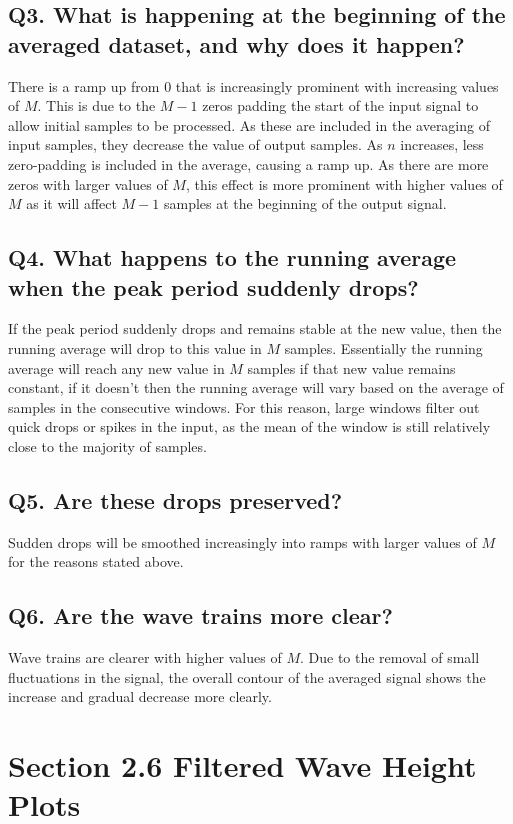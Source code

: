 \documentclass[titlepage]{scrartcl}
\begin{document}
    \subsection*{Q3. What is happening at the beginning of the averaged dataset, and why does it happen?}
    There is a ramp up from 0 that is increasingly prominent with increasing
    values of $M$. This is due to the $M-1$ zeros padding the start of the
    input signal to allow initial samples to be processed. As these are
    included in the averaging of input samples, they decrease the value of
    output samples. As $n$ increases, less zero-padding is included in the
    average, causing a ramp up. As there are more zeros with larger values of
    $M$, this effect is more prominent with higher values of $M$ as it will
    affect $M-1$ samples at the beginning of the output signal.

    \subsection*{Q4. What happens to the running average when the peak period suddenly drops?}
    If the peak period suddenly drops and remains stable at the new value, then
    the running average will drop to this value in $M$ samples. Essentially the
    running average will reach any new value in $M$ samples if that new value
    remains constant, if it doesn't then the running average will vary based on
    the average of samples in the consecutive windows. For this reason, large
    windows filter out quick drops or spikes in the input, as the mean of the
    window is still relatively close to the majority of samples.

    \subsection*{Q5. Are these drops preserved?}
    Sudden drops will be smoothed increasingly into ramps with larger values of
    $M$ for the reasons stated above.

    \subsection*{Q6. Are the wave trains more clear?}
    Wave trains are clearer with higher values of $M$.  Due to the removal of
    small fluctuations in the signal, the overall contour of the averaged
    signal shows the increase and gradual decrease more clearly.

    \section*{Section 2.6 Filtered Wave Height Plots}
    \begin{figure}[H]
    \end{figure}
\end{document}
